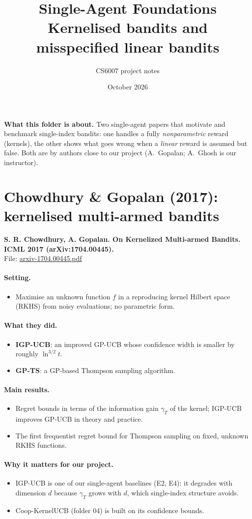 \documentclass[11pt]{article}
\title{Single-Agent Foundations\\[2pt]\large Kernelised bandits and misspecified linear bandits}
\author{CS6007 project notes}
\date{October 2026}
\newcommand{\file}[1]{\url{#1}}
\begin{document}
\maketitle
\textbf{What this folder is about.} Two single-agent papers that motivate and benchmark
single-index bandits: one handles a fully \emph{nonparametric} reward (kernels), the other shows
what goes wrong when a \emph{linear} reward is assumed but false. Both are by authors close to
our project (A.~Gopalan; A.~Ghosh is our instructor).
\tableofcontents
\bigskip
\section{Chowdhury \& Gopalan (2017): kernelised multi-armed bandits}
\textbf{S. R. Chowdhury, A. Gopalan. On Kernelized Multi-armed Bandits. ICML 2017 (arXiv:1704.00445).}\\ File: \file{arxiv-1704.00445.pdf}
\paragraph{Setting.}
\begin{itemize}\item Maximise an unknown function $f$ in a reproducing kernel Hilbert space (RKHS) from noisy evaluations; no parametric form.\end{itemize}
\paragraph{What they did.}
\begin{itemize}\item \textbf{IGP-UCB}: an improved GP-UCB whose confidence width is smaller by roughly $\ln^{3/2}t$.\item \textbf{GP-TS}: a GP-based Thompson sampling algorithm.\end{itemize}
\paragraph{Main results.}
\begin{itemize}\item Regret bounds in terms of the information gain $\gamma_T$ of the kernel; IGP-UCB improves GP-UCB in theory and practice.\item The first frequentist regret bound for Thompson sampling on fixed, unknown RKHS functions.\end{itemize}
\paragraph{Why it matters for our project.}
\begin{itemize}\item IGP-UCB is one of our single-agent baselines (E2, E4): it degrades with dimension $d$ because $\gamma_T$ grows with $d$, which single-index structure avoids.\item Coop-KernelUCB (folder 04) is built on its confidence bounds.\end{itemize}
\end{document}
